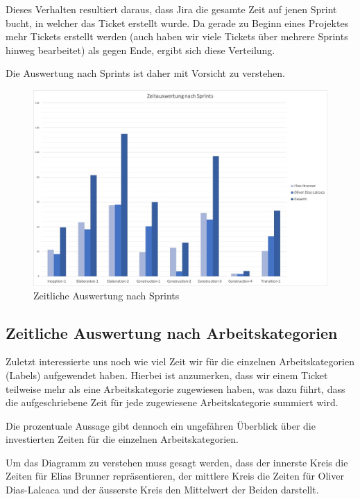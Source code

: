 Dieses Verhalten resultiert daraus, dass Jira die gesamte Zeit auf jenen Sprint bucht, in welcher das Ticket erstellt wurde. Da gerade zu Beginn eines Projektes mehr Tickets erstellt werden (auch haben wir viele Tickets über mehrere Sprints hinweg bearbeitet) als gegen Ende, ergibt sich diese Verteilung.
 
Die Auswertung nach Sprints ist daher mit Vorsicht zu verstehen.

\begin{figure}[h]
  \centering
  \includegraphics[width=1\linewidth]{./img/zeitauswertung/ZeitauswertungSprints}
  \caption{Zeitliche Auswertung nach Sprints}
  \label{fig:comparison-sprints}
\end{figure}

\subsection{Zeitliche Auswertung nach Arbeitskategorien}
Zuletzt interessierte uns noch wie viel Zeit wir für die einzelnen Arbeitskategorien (Labels) aufgewendet haben. Hierbei ist anzumerken, dass wir einem Ticket teilweise mehr als eine Arbeitskategorie zugewiesen haben, was dazu führt, dass die aufgeschriebene Zeit für jede zugewiesene Arbeitskategorie summiert wird.

Die prozentuale Aussage gibt dennoch ein ungefähren Überblick über die investierten Zeiten für die einzelnen Arbeitskategorien.

Um das Diagramm zu verstehen muss gesagt werden, dass der innerste Kreis die Zeiten für Elias Brunner repräsentieren, der mittlere Kreis die Zeiten für Oliver Dias-Lalcaca und der äusserste Kreis den Mittelwert der Beiden darstellt.

